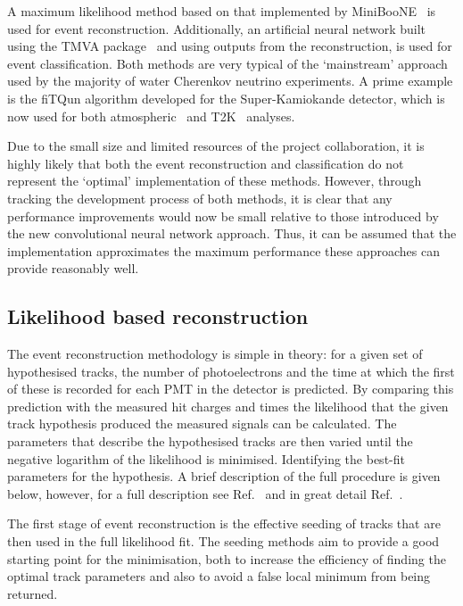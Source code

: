 A maximum likelihood method based on that implemented by MiniBooNE~\cite{patterson2009} is used
for event reconstruction. Additionally, an artificial neural network built using the TMVA
package~\cite{hocker2007} and using outputs from the reconstruction, is used for event
classification. Both methods are very typical of the `mainstream' approach used by the majority of
water Cherenkov neutrino experiments. A prime example is the fiTQun algorithm developed for the
Super-Kamiokande detector, which is now used for both atmospheric~\cite{jiang2019} and
T2K~\cite{missert2017} analyses.

Due to the small size and limited resources of the \chips project collaboration, it is highly
likely that both the event reconstruction and classification do not represent the `optimal'
implementation of these methods. However, through tracking the development process of both
methods, it is clear that any performance improvements would now be small relative to those
introduced by the new convolutional neural network approach. Thus, it can be assumed that the
implementation approximates the maximum performance these approaches can provide reasonably well.

\subsection{Likelihood based reconstruction} %
\label{sec:cvn_old_reco} %

The event reconstruction methodology is simple in theory: for a given set of hypothesised tracks,
the number of photoelectrons and the time at which the first of these is recorded for each PMT in
the detector is predicted. By comparing this prediction with the measured hit charges and times
the likelihood that the given track hypothesis produced the measured signals can be calculated.
The parameters that describe the hypothesised tracks are then varied until the negative logarithm
of the likelihood is minimised. Identifying the best-fit parameters for the hypothesis. A brief
description of the full procedure is given below, however, for a full description see
Ref.~\cite{blake2016} and in great detail Ref.~\cite{perch2017}.

The first stage of event reconstruction is the effective seeding of tracks that are then used in
the full likelihood fit. The seeding methods aim to provide a good starting point for the
minimisation, both to increase the efficiency of finding the optimal track parameters and also to
avoid a false local minimum from being returned.

